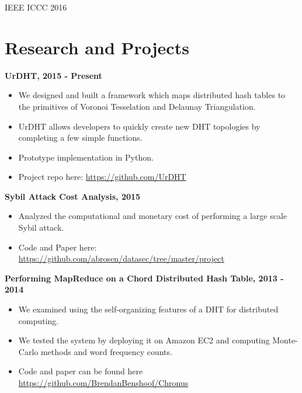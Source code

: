 \documentclass{res}
\begin{document}
\begin{resume}
\begin{enumerate}
	IEEE ICCC 2016
        
    \end{enumerate}
    
    
  
\section{Research and Projects}

{\bf UrDHT, 2015 - Present }
\begin{itemize}
	\item We designed and built a framework which maps distributed hash tables to the primitives of Voronoi Tesselation and Delaunay Triangulation.
	\item UrDHT allows developers to quickly create new DHT topologies by completing a few simple functions. 
	\item Prototype implementation in Python.
	\item Project repo here: \url{https://github.com/UrDHT}
\end{itemize}

{\bf Sybil Attack Cost Analysis, 2015}
\begin{itemize}
	\item Analyzed the computational and monetary cost of performing a large scale Sybil attack.
	\item Code and Paper here: \url{https://github.com/abrosen/datasec/tree/master/project}
\end{itemize}



{\bf Performing MapReduce on a Chord Distributed Hash Table, 2013 - 2014}
    \begin{itemize}
    \item We examined using the self-organizing features of a DHT for distributed computing.
    \item We tested the system by deploying it on Amazon EC2 and computing Monte-Carlo methods and word frequency counts. 
    \item Code and paper can be found here \url{https://github.com/BrendanBenshoof/Chronus}
    \end{itemize}
    

\end{resume}
\end{document}
